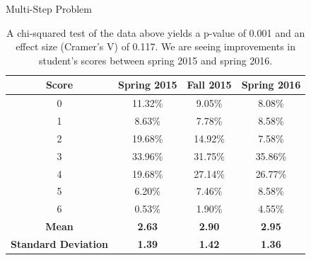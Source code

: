 \documentclass[xcolor=x11names,compress]{beamer}
\begin{document}
\begin{frame}{Multi-Step Problem}
\begin{table}[ht]
  \caption{A chi-squared test of the data above yields a p-value of 0.001 and an effect size (Cramer's V) of 0.117. We are seeing improvements in student's scores between spring 2015 and spring 2016.}
  \begin{center}
    \begin{tabular}{|c|c|c|c|}
      \hline
      \textbf{Score} & \textbf{Spring 2015} & \textbf{Fall 2015} & \textbf{Spring 2016}\\
      \hline
      {\color{DeepPink4} 0} &  {\color{DeepPink4} 11.32\%} &  {\color{DeepPink4} 9.05\%} &  {\color{DeepPink4} 8.08\%}\\
      \hline
      1 & 8.63\% & 7.78\% & 8.58\%\\
      \hline
      {\color{DeepPink4} 2} & {\color{DeepPink4} 19.68\%} & {\color{DeepPink4} 14.92\%} & {\color{DeepPink4} 7.58\%}\\
      \hline
      3 & 33.96\% & 31.75\% & 35.86\%\\
      \hline
      {\color{DodgerBlue3} 4} & {\color{DodgerBlue3} 19.68\%} & {\color{DodgerBlue3} 27.14\%} & {\color{DodgerBlue3} 26.77\%}\\
      \hline
      {\color{DodgerBlue3} 5} & {\color{DodgerBlue3} 6.20\%} & {\color{DodgerBlue3} 7.46\%} & {\color{DodgerBlue3} 8.58\%}\\
      \hline
      {\color{DodgerBlue3} 6} & {\color{DodgerBlue3} 0.53\%} & {\color{DodgerBlue3} 1.90\%} & {\color{DodgerBlue3} 4.55\%}\\
      \hline
      \textbf{Mean} & \textbf{2.63} & \textbf{2.90} & \textbf{2.95}\\
      \hline
      \textbf{Standard Deviation} & \textbf{1.39} & \textbf{1.42} & \textbf{1.36}\\
      \hline
    \end{tabular}
  \end{center}
  \label{tab:multi-step}
\end{table}
\end{frame}
\end{document}
